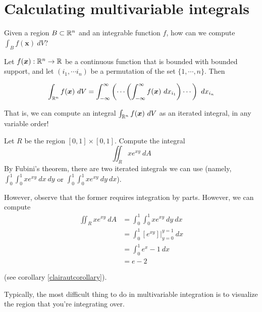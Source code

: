 \section{Calculating multivariable integrals}

    \begin{motivating}
        Given a region $B \subset \mathbb{R}^n$ and an integrable function $f$, how can we compute $\int_B f(\bm{x}) \ dV$?
    \end{motivating}

    \begin{theorem}[Fubini]
    Let $f(\bm{x}): \mathbb{R}^n \to \mathbb{R}$ be a continuous function that is bounded with bounded support, and let $(i_1, \cdots i_n)$ be a permutation of the set $\{1, \cdots, n\}$. Then 
    
    $$\int_{\mathbb{R}^n} f(\bm{x}) \ dV = \int_{-\infty}^{\infty} \left( \cdots \left(\int_{-\infty}^{\infty} f(\bm{x}) \ dx_{i_1} \right) \cdots \right) \ dx_{i_n}$$

    \end{theorem}

    That is, we can compute an integral $\int_{\mathbb{R}^n} f(\bm{x}) \ dV$ as an iterated integral, in any variable order!

    \begin{example}
        Let $R$ be the region $[0,1] \times [0,1]$.  Compute the integral 
        $$\iint_R xe^{xy} \ dA $$
        By Fubini's theorem, there are two iterated integrals we can use (namely, $\int_0^1\int_0^1 xe^{xy} \ dx \ dy$ or $\int_0^1\int_0^1 xe^{xy} \ dy \ dx$).  

        However, observe that the former requires integration by parts.  However, we can compute 
        \begin{align*}
            \iint_R xe^{xy} \ dA  &= \int_0^1\int_0^1 xe^{xy} \ dy \ dx \\
            &= \int_0^1 [e^{xy}] \bigg|_{y=0}^{y=1} \ dx \\
            &= \int_0^1 e^{x}-1 \ dx \\
            &= e-2
        \end{align*}
        
    \end{example}


    \begin{remark}
         (see corollary \ref{clairautcorollary}).
    \end{remark}

    Typically, the most difficult thing to do in multivariable integration is to visualize the region that you're integrating over.  

